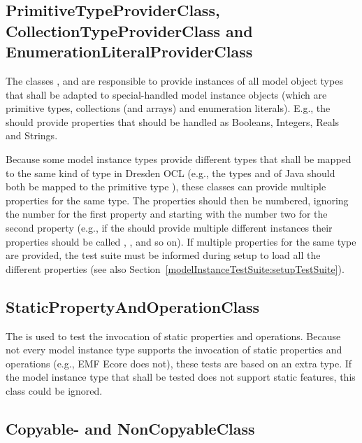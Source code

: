 \subsection{PrimitiveTypeProviderClass, CollectionTypeProviderClass and 
E\-nu\-me\-ra\-tion\-Li\-te\-ral\-ProviderClass}
\label{modelInstanceTestSuite:specialTypeProviderClasses}

The classes , 
 and 
 are responsible to provide 
instances of all model object types that shall be adapted to special-handled 
model instance objects (which are primitive types, collections (and arrays) and
enumeration literals). E.g., the  should 
provide properties that should be handled as Booleans, Integers, Reals and 
Strings.

Because some model instance types provide different types that shall be mapped
to the same kind of type in Dresden OCL (e.g., the types  and
 of Java should both be mapped to the primitive type 
), these classes can provide multiple properties for the same 
type. The properties should then be numbered, ignoring the number for the first 
property and starting with the number two for the second property (e.g., if the 
 should provide multiple 
different  instances their properties should be called 
, ,  and so 
on). If multiple properties for the same type are provided, the test suite must 
be informed during setup to load all the different properties (see also 
Section~\ref{modelInstanceTestSuite:setupTestSuite}).


\subsection{StaticPropertyAndOperationClass}

The  is used to test the invocation of 
static properties and operations. Because not every model instance type supports
the invocation of static properties and operations (e.g., \acs{EMF} Ecore does 
not), these tests are based on an extra type. If the model instance type that
shall be tested does not support static features, this class could be ignored.


\subsection{Copyable- and NonCopyableClass}

